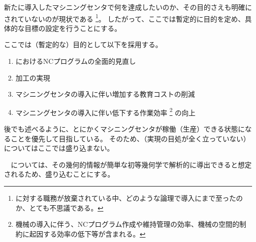 

新たに導入したマシニングセンタで何を達成したいのか、その目的さえも明確にされていないのが現状である
\footnote{\MMC に対する職務が放棄されている中、どのような論理で導入にまで至ったのか、とても不思議である。}。
したがって、ここでは暫定的に目的を定め、具体的な目標の設定を行うことにする。



ここでは（暫定的な）目的として以下を採用する。
\begin{enumerate}[label=\sarrow]
\item \MMC におけるNCプログラムの全面的見直し
\item \Dimple 加工の実現
\item マシニングセンタの導入に伴い増加する教育コストの削減
\item マシニングセンタの導入に伴い低下する作業効率%
\footnote{機械の導入に伴う、NCプログラム作成や維持管理の効率、機械の空間的制約に起因する効率の低下等が含まれる。}
の向上
\end{enumerate}
\begin{hosoku}
後でも述べるように、とにかくマシニングセンタが稼働（生産）できる状態になることを優先して目指している。
そのため、（実現の目処が全く立っていない）\ReliefGrooveMilling についてはここでは盛り込まない。

　\Dimple については、その幾何的情報が簡単な初等幾何学で解析的に導出できると想定されるため、盛り込むことにする。
\end{hosoku}


\clearpage


